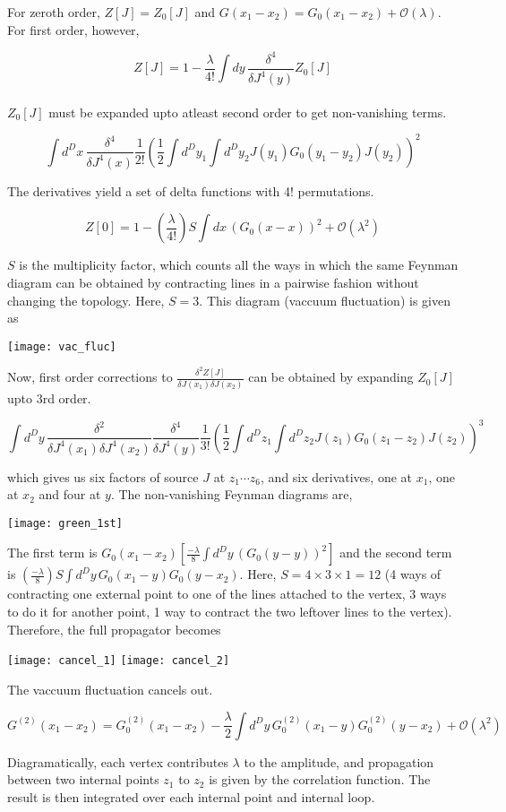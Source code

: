 \noindent For zeroth order, $Z[J]=Z_0[J]$ and $G(x_1-x_2)=G_0(x_1-x_2)+\mathcal{O}(\lambda)$. For first order, however,

$$Z[J]=1-\frac{\lambda}{4!}\int dy\,\frac{\delta^4}{\delta J^4(y)}Z_0[J]$$\\

\noindent $Z_0[J]$ must be expanded upto atleast second order to get non-vanishing terms.

$$\int d^Dx\,\frac{\delta^4}{\delta J^4(x)}\frac{1}{2!}\left(\frac{1}{2}\int d^Dy_1\int d^Dy_2J(y_1)G_0(y_1-y_2)J(y_2)\right)^2$$

\noindent The derivatives yield a set of delta functions with 4! permutations.

$$Z[0]=1-\left(\frac{\lambda}{4!}\right)S\int dx\,(G_0(x-x))^2+\mathcal{O}(\lambda^2)$$

\noindent $S$ is the multiplicity factor, which counts all the ways in which the same Feynman diagram can be obtained by contracting lines in a pairwise fashion without changing the topology. Here, $S=3$. This diagram (vaccuum fluctuation) is given as

\begin{center}
    \texttt{[image: vac\_fluc]}
\end{center}

\noindent Now, first order corrections to $\frac{\delta^2 Z[J]}{\delta J(x_1)\delta J(x_2)}$ can be obtained by expanding $Z_0[J]$ upto 3rd order.

$$\int d^Dy\,\frac{\delta^2}{\delta J^4(x_1)\delta J^4(x_2)}\frac{\delta^4}{\delta J^4(y)}\frac{1}{3!}\left(\frac{1}{2}\int d^Dz_1\int d^Dz_2J(z_1)G_0(z_1-z_2)J(z_2)\right)^3$$

\noindent which gives us six factors of source $J$ at $z_1\cdots z_6$, and six derivatives, one at $x_1$, one at $x_2$ and four at $y$. The non-vanishing Feynman diagrams are, 

\begin{center}
    \texttt{[image: green\_1st]}
\end{center}

\noindent The first term is $G_0(x_1-x_2)\left[\frac{-\lambda}{8}\int d^Dy\,(G_0(y-y))^2\right]$ and the second term is $\left(\frac{-\lambda}{8}\right)S\int d^Dy\,G_0(x_1-y)G_0(y-x_2)$. Here, $S=4\times 3\times 1=12$ (4 ways of contracting one external point to one of the lines attached to the vertex, 3 ways to do it for another point, 1 way to contract the two leftover lines to the vertex). Therefore, the full propagator becomes

\begin{center}
    \texttt{[image: cancel\_1]}
    \texttt{[image: cancel\_2]}
\end{center}

\noindent The vaccuum fluctuation cancels out. 

$$G^{(2)}(x_1-x_2)=G_0^{(2)}(x_1-x_2)-\frac{\lambda}{2}\int d^Dy\,G_0^{(2)}(x_1-y)G_0^{(2)}(y-x_2)+\mathcal{O}(\lambda^2)$$

\noindent Diagramatically, each vertex contributes $\lambda$ to the amplitude, and propagation between two internal points $z_1$ to $z_2$ is given by the correlation function. The result is then integrated over each internal point and internal loop.